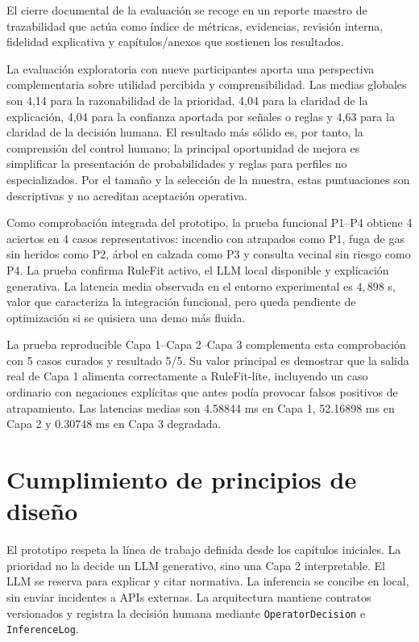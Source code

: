 El cierre documental de la evaluación se recoge en un reporte maestro de trazabilidad que actúa como
índice de métricas, evidencias, revisión interna, fidelidad
explicativa y capítulos/anexos que sostienen los resultados.

La evaluación exploratoria con nueve participantes aporta una perspectiva complementaria
sobre utilidad percibida y comprensibilidad. Las medias globales son 4,14 para la
razonabilidad de la prioridad, 4,04 para la claridad de la explicación, 4,04
para la confianza aportada por señales o reglas y 4,63 para la claridad de la
decisión humana. El resultado más sólido es, por tanto, la comprensión del control humano;
la principal oportunidad de mejora es simplificar la presentación de probabilidades y
reglas para perfiles no especializados. Por el tamaño y la selección de la muestra, estas
puntuaciones son descriptivas y no acreditan aceptación operativa.

Como comprobación integrada del prototipo, la prueba funcional P1--P4 obtiene 4 aciertos en
4 casos representativos: incendio con atrapados como P1, fuga de gas sin heridos como
P2, árbol en calzada como P3 y consulta vecinal sin riesgo como P4. La prueba confirma
RuleFit activo, el LLM local disponible y explicación generativa. La latencia media
observada en el entorno experimental es \(4{,}898\) s, valor que caracteriza la integración funcional, pero queda
pendiente de optimización si se quisiera una demo más fluida.

La prueba reproducible Capa 1--Capa 2--Capa 3 complementa esta comprobación con 5
casos curados y resultado 5/5. Su valor principal es demostrar que la salida real de
Capa 1 alimenta correctamente a RuleFit-lite, incluyendo un caso ordinario con
negaciones explícitas que antes podía provocar falsos positivos de atrapamiento. Las
latencias medias son 4.58844 ms en Capa 1, 52.16898 ms en Capa 2 y 0.30748 ms en Capa
3 degradada.

\section{Cumplimiento de principios de diseño}

El prototipo respeta la línea de trabajo definida desde los capítulos iniciales. La
prioridad no la decide un LLM generativo, sino una Capa 2 interpretable. El LLM se
reserva para explicar y citar normativa. La inferencia se concibe en local, sin enviar
incidentes a APIs externas. La arquitectura mantiene contratos versionados y registra
la decisión humana mediante \texttt{OperatorDecision} e \texttt{InferenceLog}.

